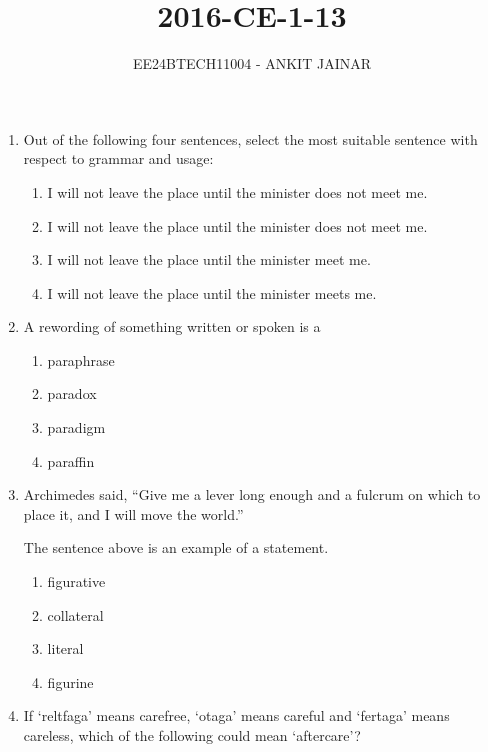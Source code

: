 \documentclass[journal,12pt,onecolumn]{IEEEtran}
\theoremstyle{remark}
\begin{document}

\vspace{3cm}

\title{2016-CE-1-13}
\author{EE24BTECH11004 - ANKIT JAINAR}
\maketitle
\bigskip

\renewcommand{\thefigure}{\theenumi}
\renewcommand{\thetable}{\theenumi}
\setlength{\columnsep}{2.5em}
\begin{enumerate}

\item Out of the following four sentences, select the most suitable sentence with respect to grammar and usage:
\begin{enumerate}
    \item I will not leave the place until the minister does not meet me.
    \item I will not leave the place until the minister does not meet me.
    \item I will not leave the place until the minister meet me.
    \item I will not leave the place until the minister meets me.
\end{enumerate}

\item A rewording of something written or spoken is a 
\begin{enumerate}
    \item paraphrase
    \item paradox
    \item paradigm
    \item paraffin
\end{enumerate}

\item Archimedes said, ``Give me a lever long enough and a fulcrum on which to place it, and I will move the world.''

The sentence above is an example of a statement.
\begin{enumerate}
    \item figurative
    \item collateral
    \item literal
    \item figurine
\end{enumerate}

\item If `reltfaga' means carefree, `otaga' means careful and `fertaga' means careless, which of the following could mean `aftercare'?


\end{enumerate}
\end{document}
